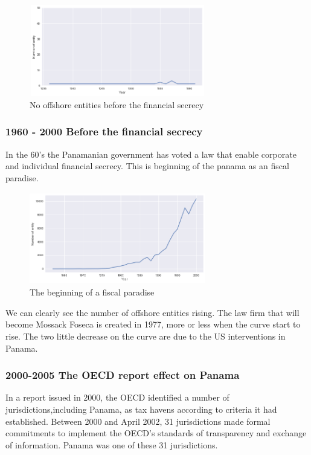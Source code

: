 \documentclass[11pt]{article}
\begin{document}
\begin{figure}[h]
	\centering
    \includegraphics[width=7.7cm,height=4cm]{35-60}
    \caption{No offshore entities before the financial secrecy}
    \label{fig:b}
\end{figure}

\subsubsection{1960 - 2000 Before the financial secrecy}
In the 60's the Panamanian government has voted a law that enable corporate and individual financial secrecy. This is beginning of the panama as an fiscal paradise.

\begin{figure}[h]
	\centering
    \includegraphics[width=7.7cm,height=4cm]{60-2000}
    \caption{The beginning of a fiscal paradise}
    \label{fig:c}
\end{figure}

We can clearly see the number of offshore entities rising. The law firm that will become Mossack Foseca is created in 1977, more or less when the curve start to rise. 
The two little decrease on the curve are due to the US interventions in Panama. 

\subsubsection{2000-2005 The OECD report effect on Panama}

In a report issued in 2000, the OECD identified a number of jurisdictions,including Panama, as tax havens according to criteria  it had established. Between 2000 and April 2002, 31 jurisdictions made formal commitments to implement the OECD’s standards of transparency and exchange of information. Panama was one of these 31 jurisdictions.
\end{document}
